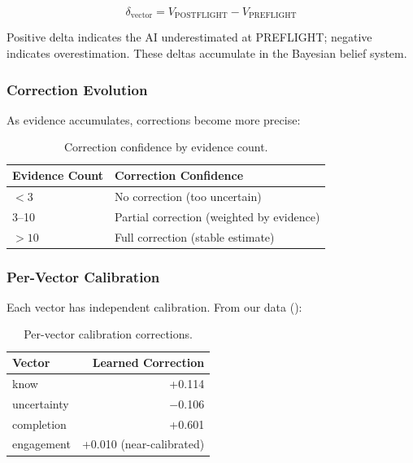 \begin{equation}
\delta_{\text{vector}} = V_{\text{POSTFLIGHT}} - V_{\text{PREFLIGHT}}
\end{equation}

Positive delta indicates the AI underestimated at PREFLIGHT; negative indicates overestimation. These deltas accumulate in the Bayesian belief system.

\subsubsection{Correction Evolution}

As evidence accumulates, corrections become more precise:

\begin{table}[h]
\centering
\begin{tabular}{ll}
\toprule
\textbf{Evidence Count} & \textbf{Correction Confidence} \\
\midrule
$< 3$ & No correction (too uncertain) \\
3--10 & Partial correction (weighted by evidence) \\
$> 10$ & Full correction (stable estimate) \\
\bottomrule
\end{tabular}
\caption{Correction confidence by evidence count.}
\label{tab:correction-evolution}
\end{table}

\subsubsection{Per-Vector Calibration}

Each vector has independent calibration. From our data ():

\begin{table}[h]
\centering
\begin{tabular}{lr}
\toprule
\textbf{Vector} & \textbf{Learned Correction} \\
\midrule
know & +0.114 \\
uncertainty & $-$0.106 \\
completion & +0.601 \\
engagement & +0.010 (near-calibrated) \\
\bottomrule
\end{tabular}
\caption{Per-vector calibration corrections.}
\label{tab:per-vector-calibration}
\end{table}

